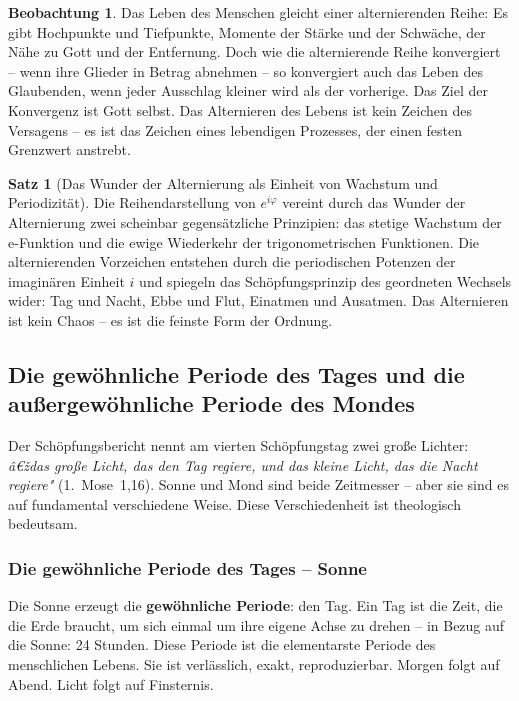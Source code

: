 ﻿\documentclass[a4paper,12pt]{article}
\theoremstyle{definition}
\newtheorem{theorem}{Satz}[section]
\newtheorem{observation}{Beobachtung}[section]
\begin{document}
\begin{observation}
	Das Leben des Menschen gleicht einer alternierenden Reihe: Es gibt Hochpunkte
	und Tiefpunkte, Momente der Stärke und der Schwäche, der Nähe zu Gott und der
	Entfernung. Doch wie die alternierende Reihe konvergiert -- wenn ihre Glieder
	in Betrag abnehmen -- so konvergiert auch das Leben des Glaubenden, wenn jeder
	Ausschlag kleiner wird als der vorherige. Das Ziel der Konvergenz ist Gott selbst.
	Das Alternieren des Lebens ist kein Zeichen des Versagens -- es ist das Zeichen
	eines lebendigen Prozesses, der einen festen Grenzwert anstrebt.
\end{observation}

\begin{theorem}[Das Wunder der Alternierung als Einheit von Wachstum und Periodizität]
	Die Reihendarstellung von $e^{i\varphi}$ vereint durch das Wunder der
	Alternierung zwei scheinbar gegensätzliche Prinzipien: das stetige Wachstum
	der e-Funktion und die ewige Wiederkehr der trigonometrischen
	Funktionen. Die alternierenden Vorzeichen entstehen durch die periodischen
	Potenzen der imaginären Einheit $i$ und spiegeln das Schöpfungsprinzip des
	geordneten Wechsels wider: Tag und Nacht, Ebbe und Flut, Einatmen und Ausatmen.
	Das Alternieren ist kein Chaos -- es ist die feinste Form der Ordnung.
\end{theorem}

\subsection{Die gewöhnliche Periode des Tages und die außergewöhnliche
	Periode des Mondes}

Der Schöpfungsbericht nennt am vierten Schöpfungstag zwei große Lichter:
\textit{â€ždas große Licht, das den Tag regiere, und das kleine Licht, das die Nacht
	regiere"} (1.~Mose~1,16). Sonne und Mond sind beide Zeitmesser -- aber sie sind
es auf fundamental verschiedene Weise. Diese Verschiedenheit ist theologisch
bedeutsam.

\subsubsection{Die gewöhnliche Periode des Tages -- Sonne}

Die Sonne erzeugt die \textbf{gewöhnliche Periode}: den Tag. Ein Tag ist die Zeit,
die die Erde braucht, um sich einmal um ihre eigene Achse zu drehen -- in Bezug
auf die Sonne: 24 Stunden. Diese Periode ist die elementarste Periode des
menschlichen Lebens. Sie ist verlässlich, exakt, reproduzierbar. Morgen folgt auf
Abend. Licht folgt auf Finsternis.
\end{document}
